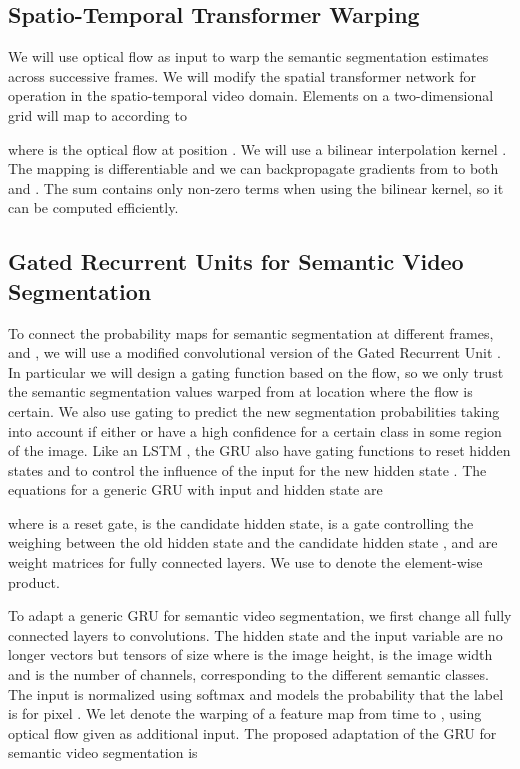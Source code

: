 \documentclass[10pt,twocolumn,letterpaper]{article}
\begin{document}
\subsection{Spatio-Temporal Transformer Warping}\label{sec:stnet}

We will use optical flow as input to warp the semantic segmentation estimates across successive frames. We will modify the spatial transformer network \cite{jaderberg2015spatial} for operation in the spatio-temporal video domain. Elements on a two-dimensional grid  will map to  according to

where  is the optical flow at position . We will use a bilinear interpolation kernel . The mapping is differentiable and we can backpropagate gradients from  to both  and . The sum contains only  non-zero terms when using the bilinear kernel, so it can be computed efficiently.



\subsection{Gated Recurrent Units for Semantic Video Segmentation}\label{sec:gru}


To connect the probability maps for semantic segmentation at different frames,  and , we will use a modified convolutional version of the Gated Recurrent Unit \cite{chung2014empirical}. In particular we will design a gating function based on the flow, so we only trust the semantic segmentation values warped from  at location where the flow is certain. We also use gating to predict the new segmentation probabilities taking into account if either  or  have a high confidence for a certain class in some region of the image. Like an LSTM \cite{hochreiter1997long}, the GRU also have gating functions to reset hidden states and to control the influence of the input  for the new hidden state . The equations for a generic GRU with input  and hidden state  are

where  is a reset gate,  is the candidate hidden state,  is a gate controlling the weighing between the old hidden state  and the candidate hidden state , and  are weight matrices for fully connected layers. We use  to denote the element-wise product.

To adapt a generic GRU for semantic video segmentation, we first change all fully connected layers to convolutions. The hidden state  and the input variable  are no longer vectors but tensors of size  where  is the image height,  is the image width and  is the number of channels, corresponding to the different semantic classes. The input  is normalized using softmax and  models the probability that the label is  for pixel . We let  denote the warping of a feature map  from time  to , using optical flow given as additional input. The proposed adaptation of the GRU for semantic video segmentation is
\end{document}
